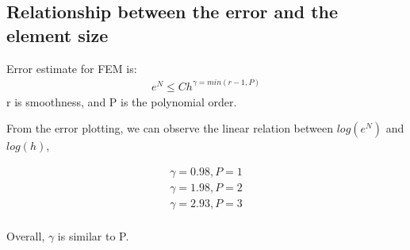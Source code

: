 \documentclass[paper=a4, fontsize=11pt]{article} %
\begin{document}
        


\subsection{Relationship between the error and the element size}
Error estimate for FEM is:
\begin{eqnarray}
e^N \leq Ch^{\gamma = min (r-1, P)}
\end{eqnarray}
r is smoothness, and P is the polynomial order.

From the error plotting, we can observe the linear relation between $log(e^N)$ and $log(h)$, 

\begin{eqnarray}
\gamma = 0.98, P=1\nonumber\\
\gamma = 1.98, P=2\nonumber\\
\gamma = 2.93, P=3\nonumber\\
\end{eqnarray}

Overall, $\gamma$ is similar  to P. 


\end{document}
